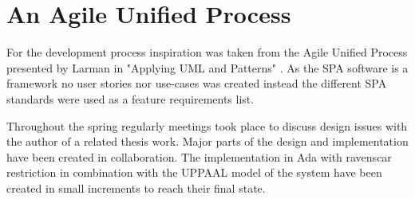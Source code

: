 \section{An Agile Unified Process}
For the development process inspiration was taken from the Agile Unified
Process presented by Larman in "Applying UML and Patterns" \cite{larman2005}.
As the SPA software is a framework no user stories nor use-cases was created
instead the different SPA standards were used as a feature requirements list.

Throughout the spring regularly meetings took place to discuss design issues
with the author of a related thesis work. Major parts of the design and
implementation have been created in collaboration. The implementation in Ada
with ravenscar restriction in combination with the UPPAAL model of the system
have been created in small increments to reach their final state.

